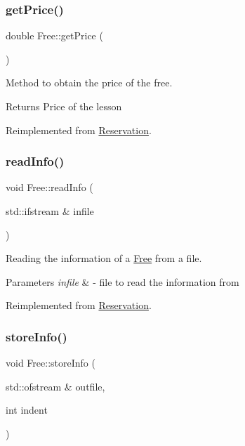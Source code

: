 \subsubsection{\texorpdfstring{get\+Price()}{getPrice()}}
{\footnotesize\ttfamily double Free\+::get\+Price (\begin{DoxyParamCaption}{ }\end{DoxyParamCaption})\hspace{0.3cm}{\ttfamily [virtual]}}



Method to obtain the price of the free. 

\begin{DoxyReturn}{Returns}
Price of the lesson 
\end{DoxyReturn}


Reimplemented from \mbox{\hyperlink{class_reservation_a62cdb2f1a24e2fce92fb9f024ae9f494}{Reservation}}.

\mbox{\label{class_free_ad1023c825c9790edf0797e2e69dd2fcf}} 
\subsubsection{\texorpdfstring{read\+Info()}{readInfo()}}
{\footnotesize\ttfamily void Free\+::read\+Info (\begin{DoxyParamCaption}\item[{std\+::ifstream \&}]{infile }\end{DoxyParamCaption})\hspace{0.3cm}{\ttfamily [virtual]}}



Reading the information of a \mbox{\hyperlink{class_free}{Free}} from a file. 


\begin{DoxyParams}{Parameters}
{\em infile} & -\/ file to read the information from \\
\hline
\end{DoxyParams}


Reimplemented from \mbox{\hyperlink{class_reservation_acff32024a350c2156af9f74522c59b7b}{Reservation}}.

\mbox{\label{class_free_a5eec9da16ebf4f388d16dd270bd93b64}} 
\subsubsection{\texorpdfstring{store\+Info()}{storeInfo()}}
{\footnotesize\ttfamily void Free\+::store\+Info (\begin{DoxyParamCaption}\item[{std\+::ofstream \&}]{outfile,  }\item[{int}]{indent }\end{DoxyParamCaption})\hspace{0.3cm}{\ttfamily [virtual]}}



